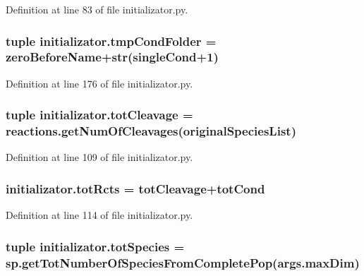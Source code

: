 Definition at line 83 of file initializator.\+py.

\hypertarget{a00137_ad43d43e724c966749db268c9b523a02c}{
\subsubsection[{tmp\+Cond\+Folder}]{\setlength{\rightskip}{0pt plus 5cm}tuple initializator.\+tmp\+Cond\+Folder = {\bf zero\+Before\+Name}+str(single\+Cond+1)}}\label{a00137_ad43d43e724c966749db268c9b523a02c}


Definition at line 176 of file initializator.\+py.

\hypertarget{a00137_a517da3913f56e5216fa2c68818e04ecc}{
\subsubsection[{tot\+Cleavage}]{\setlength{\rightskip}{0pt plus 5cm}tuple initializator.\+tot\+Cleavage = reactions.\+get\+Num\+Of\+Cleavages({\bf original\+Species\+List})}}\label{a00137_a517da3913f56e5216fa2c68818e04ecc}


Definition at line 109 of file initializator.\+py.

\hypertarget{a00137_a1c0855f92c2dd2dd4a30f6624f6e1af0}{
\subsubsection[{tot\+Rcts}]{\setlength{\rightskip}{0pt plus 5cm}initializator.\+tot\+Rcts = {\bf tot\+Cleavage}+tot\+Cond}}\label{a00137_a1c0855f92c2dd2dd4a30f6624f6e1af0}


Definition at line 114 of file initializator.\+py.

\hypertarget{a00137_a7f8e1635318ca1aac728dd7165aa49b5}{
\subsubsection[{tot\+Species}]{\setlength{\rightskip}{0pt plus 5cm}tuple initializator.\+tot\+Species = sp.\+get\+Tot\+Number\+Of\+Species\+From\+Complete\+Pop(args.\+max\+Dim)}}\label{a00137_a7f8e1635318ca1aac728dd7165aa49b5}


